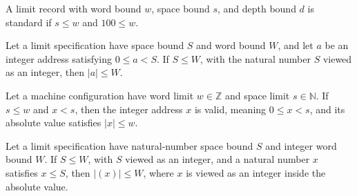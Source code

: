 \begin{definition}
\label{Light.Std}
\leanok
{}
A limit record with word bound $w$, space bound $s$, and depth bound $d$ is standard if
$s\le w$ and $100\le w$.
\end{definition}

\begin{theorem}
\label{Light.Limits.Addr.abs_le}
\leanok
{}
Let a limit specification have space bound $S$ and word bound $W$, and let $a$ be an
integer address satisfying $0\le a<S$. If $S\le W$, with the natural number $S$ viewed
as an integer, then $|a|\le W$.
\end{theorem}

\begin{theorem}
\label{Light.Limits.addr_of_lt}
\leanok
{}
Let a machine configuration have word limit $w\in\mathbb Z$ and space limit $s\in\mathbb
N$. If $s\le w$ and $x<s$, then the integer address $x$ is valid, meaning $0\le x<s$,
and its absolute value satisfies $|x|\le w$.
\end{theorem}

\begin{theorem}
\label{Light.Limits.abs_le_of_le}
\leanok
{}
Let a limit specification have natural-number space bound $S$ and integer word bound
$W$. If $S\le W$, with $S$ viewed as an integer, and a natural number $x$ satisfies
$x\le S$, then $|(x)|\le W$, where $x$ is viewed as an integer inside the absolute
value.
\end{theorem}
